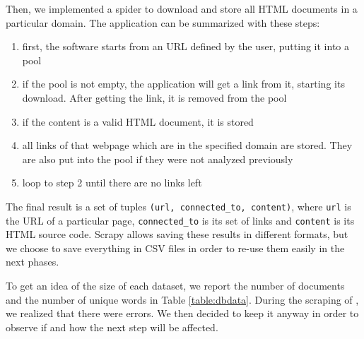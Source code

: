 Then, we implemented a spider to download and store all HTML documents in a particular domain.
The application can be summarized with these steps:
\begin{enumerate}
    \item first, the software starts from an URL defined by the user, putting it into a pool
    \item if the pool is not empty, the application will get a link from it, starting its download. After getting the link, it is removed from the pool
    \item if the content is a valid HTML document, it is stored
    \item all links of that webpage which are in the specified domain are stored. They are also put into the pool if they were not analyzed previously
    \item loop to step 2 until there are no links left
\end{enumerate}
The final result is a set of tuples \texttt{(url, connected\_to, content)}, where \texttt{url} is the URL of a particular page, \texttt{connected\_to} is its set of links and \texttt{content} is its HTML source code.
Scrapy allows saving these results in different formats, but we choose to save everything in CSV files in order to re-use them easily in the next phases.

To get an idea of the size of each dataset, we report the number of documents and the number of unique words in Table \ref{table:dbdata}.
During the scraping of , we realized that there were errors. We then decided to keep it anyway in order to observe if and how the next step will be affected.

